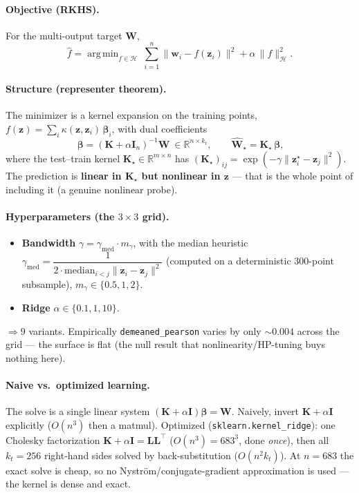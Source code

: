 \documentclass[11pt]{article}
\newcommand{\code}[1]{\texttt{#1}}
\newcommand{\R}{\mathbb{R}}
\newcommand{\T}{^{\!\top}}
\newcommand{\W}{\mathbf{W}}
\newcommand{\bI}{\mathbf{I}}
\newcommand{\norm}[1]{\lVert #1 \rVert}
\DeclareMathOperator*{\argmin}{arg\,min}
\begin{document}
\paragraph{Objective (RKHS).} For the multi-output target $\W$,
\[
  \widehat f=\argmin_{f\in\mathcal H}\ \sum_{i=1}^{n}\norm{\mathbf w_i-f(\mathbf z_i)}^2+\alpha\,\norm{f}_{\mathcal H}^2 .
\]
\paragraph{Structure (representer theorem).} The minimizer is a kernel expansion on the training
points, $f(\mathbf z)=\sum_i \kappa(\mathbf z,\mathbf z_i)\,\boldsymbol\beta_i$, with dual
coefficients
\[
  \boxed{\ \boldsymbol\beta=(\mathbf K+\alpha\bI_n)^{-1}\W\ }\in\R^{n\times k_t},\qquad
  \widehat{\W}_\star=\mathbf K_\star\,\boldsymbol\beta,
\]
where the test--train kernel $\mathbf K_\star\in\R^{m\times n}$ has
$(\mathbf K_\star)_{ij}=\exp(-\gamma\norm{\mathbf z^\star_i-\mathbf z_j}^2)$. The prediction is
\textbf{linear in $\mathbf K_\star$ but nonlinear in $\mathbf z$} --- that is the whole point of
including it (a genuine nonlinear probe).

\paragraph{Hyperparameters (the $3\times3$ grid).}
\begin{itemize}[leftmargin=1.4em,nosep]
\item \textbf{Bandwidth} $\gamma=\gamma_{\mathrm{med}}\cdot m_\gamma$, with the median heuristic
  $\gamma_{\mathrm{med}}=\dfrac{1}{2\cdot\mathrm{median}_{i<j}\norm{\mathbf z_i-\mathbf z_j}^2}$
  (computed on a deterministic 300-point subsample), $m_\gamma\in\{0.5,1,2\}$.
\item \textbf{Ridge} $\alpha\in\{0.1,1,10\}$.
\end{itemize}
$\Rightarrow 9$ variants. Empirically \code{demeaned\_pearson} varies by only $\sim0.004$ across the
grid --- the surface is flat (the null result that nonlinearity/HP-tuning buys nothing here).

\paragraph{Naive vs.\ optimized learning.} The solve is a single linear system
$(\mathbf K+\alpha\bI)\boldsymbol\beta=\W$. Naively, invert $\mathbf K+\alpha\bI$ explicitly
($O(n^3)$ then a matmul). Optimized (\code{sklearn.kernel\_ridge}): one Cholesky factorization
$\mathbf K+\alpha\bI=\mathbf L\mathbf L\T$ ($O(n^3)=683^3$, done \emph{once}), then all $k_t=256$
right-hand sides solved by back-substitution ($O(n^2 k_t)$). At $n=683$ the exact solve is cheap,
so no Nystr\"om/conjugate-gradient approximation is used --- the kernel is dense and exact.
\end{document}
